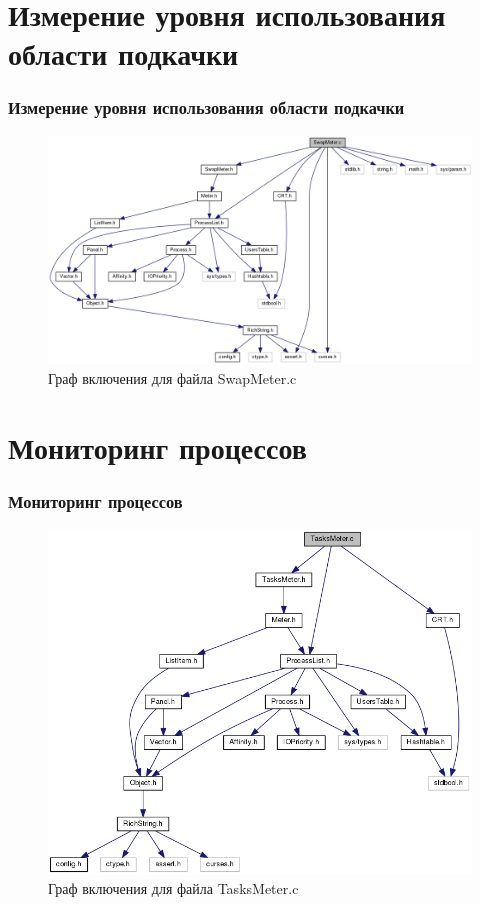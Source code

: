 \documentclass{beamer}
\begin{document}
\section{Измерение уровня использования области подкачки}

\begin{frame}
\frametitle{Измерение уровня использования области подкачки}

\begin{figure}
\includegraphics[scale=0.3]{res/swap_meter.png}
\caption{Граф включения для файла SwapMeter.c}
\end{figure}

\end{frame}
\section{Мониторинг процессов}

\begin{frame}
\frametitle{Мониторинг процессов}

\begin{figure}
\includegraphics[scale=0.3]{res/tasks_meter.png}
\caption{Граф включения для файла TasksMeter.c}
\end{figure}

\end{frame}
\end{document}
